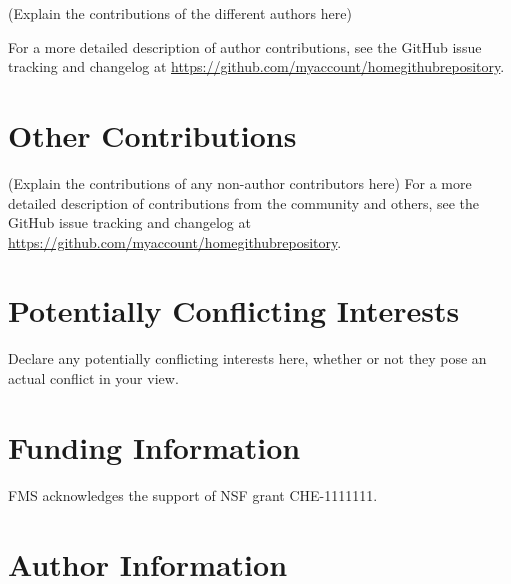 \documentclass[9pt,roundtable]{livecoms}
\newcommand{\githubrepository}{\url{https://github.com/myaccount/homegithubrepository}}  %
\begin{document}
(Explain the contributions of the different authors here)

For a more detailed description of author contributions,
see the GitHub issue tracking and changelog at \githubrepository.

\section*{Other Contributions}
%

(Explain the contributions of any non-author contributors here)
For a more detailed description of contributions from the community and others, see the GitHub issue tracking and changelog at \githubrepository.

\section*{Potentially Conflicting Interests}

Declare any potentially conflicting interests here, whether or not they pose an actual conflict in your view.

\section*{Funding Information}
FMS acknowledges the support of NSF grant CHE-1111111.

\section*{Author Information}
\makeorcid




\end{document}
